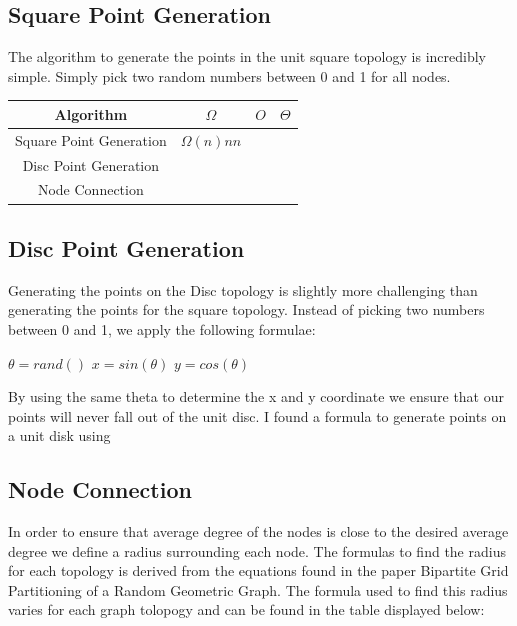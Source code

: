 \documentclass{article}
\begin{document}
  \subsection{Square Point Generation}
		The algorithm to generate the points in the unit square topology is incredibly simple.
		Simply pick two random numbers between 0 and 1 for all nodes.

	\begin{center}
		\begin{table}
			\begin{tabular}{ |c|c|c|c| }
				\hline
				Algorithm & $\Omega$ & $O$ & $\Theta$ \\
				\hline
				Square Point Generation & $\Omega(n)nn$  & & \\
				\hline
				Disc Point Generation & & & \\
				\hline
				Node Connection & & & \\
				\hline

			\end{tabular}
		\end{table}
	\end{center}

  \subsection{Disc Point Generation}
		Generating the points on the Disc topology is slightly more challenging than generating the points for the square topology.
		Instead of picking two numbers between 0 and 1, we apply the following formulae:
  	\begin{center}
    $\theta=rand()$ \newline
    $x=sin(\theta)$ \newline
    $y=cos(\theta)$ \newline
  	\end{center}
		By using the same theta to determine the x and y coordinate we ensure that our points will never fall out of the unit disc.
		I found a formula to generate points on a unit disk using \cite{40023}

		\subsection{Node Connection}
		In order to ensure that average degree of the nodes is close to the desired average degree we define a radius surrounding each node.
		The formulas to find the radius for each topology is derived from the equations found in the paper Bipartite Grid Partitioning of a Random Geometric Graph\cite{chen2017bipartite}.
		The formula used to find this radius varies for each graph tolopogy and can be found in the table displayed below:
\end{document}
